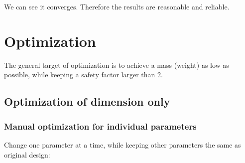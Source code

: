 \documentclass[a4paper,14pt]{extarticle}
\begin{document}
We can see it converges. Therefore the results are reasonable and reliable.
\section{Optimization}
The general target of optimization is to achieve a mass (weight) as low as possible, while keeping a safety factor larger than 2.

\subsection{Optimization of dimension only}
\subsubsection{Manual optimization for individual parameters}
Change one parameter at a time, while keeping other parameters the same as original design:
\end{document}
